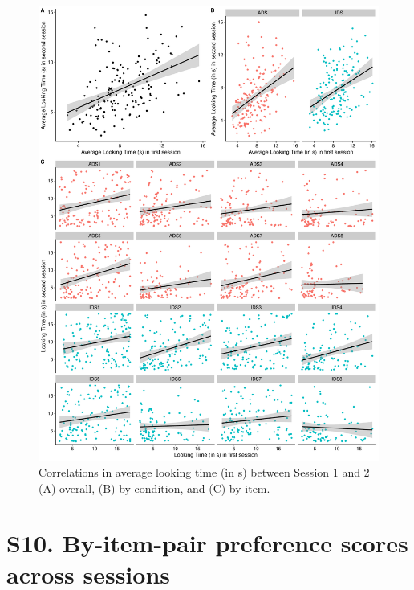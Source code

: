 \documentclass[
  man, donotrepeattitle,floatsintext]{apa6}
\begin{document}
\begin{figure}

{\centering \includegraphics{MB1T_supplement_files/figure-latex/sfig10-1} 

}

\caption{Correlations in average looking time (in s) between Session 1 and 2 (A) overall, (B) by condition, and (C) by item.}\label{fig:sfig10}
\end{figure}

\newpage

\hypertarget{s10.-by-item-pair-preference-scores-across-sessions}{%
\section{S10. By-item-pair preference scores across sessions}\label{s10.-by-item-pair-preference-scores-across-sessions}}
\end{document}
